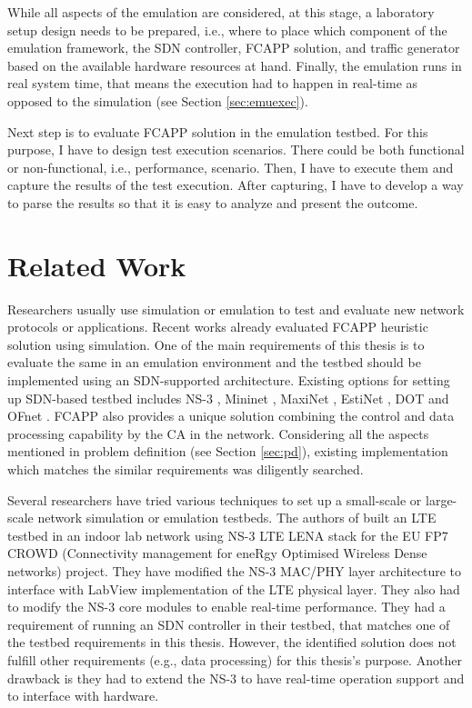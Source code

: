 While all aspects of the emulation are considered, at this stage, a laboratory setup design needs to be prepared, i.e., where to place which component of the emulation framework, the SDN controller, FCAPP solution, and traffic generator based on the available hardware resources at hand. Finally, the emulation runs in real system time, that means the execution had to happen in real-time as opposed to the simulation (see Section \ref{sec:emuexec}).

Next step is to evaluate FCAPP solution in the emulation testbed. For this purpose, I have to design test execution scenarios. There could be both functional or non-functional, i.e., performance, scenario. Then, I have to execute them and capture the results of the test execution. After capturing, I have to develop a way to parse the results so that it is easy to analyze and present the outcome.

\section{Related Work}
Researchers usually use simulation or emulation to test and evaluate new network protocols or applications. Recent works \cite{7343600} already evaluated FCAPP heuristic solution using simulation. One of the main requirements of this thesis is to evaluate the same in an emulation environment and the testbed should be implemented using an SDN-supported architecture. Existing options for setting up SDN-based testbed includes NS-3 \cite{ns-3}, Mininet \cite{Lantz:2010:NLR:1868447.1868466}, MaxiNet \cite{6857078}, EstiNet \cite{6588659}, DOT \cite{6838241} and OFnet \cite{ofnet}. FCAPP also provides a unique solution combining the control and data processing capability by the CA in the network. Considering all the aspects mentioned in problem definition (see Section \ref{sec:pd}), existing implementation which matches the similar requirements was diligently searched.

Several researchers have tried various techniques to set up a small-scale or large-scale network simulation or emulation testbeds. The authors of \cite{Gupta:2015:NRE:2756509.2756516} built an LTE testbed in an indoor lab network using NS-3 LTE LENA stack for the EU FP7 CROWD (Connectivity management for eneRgy Optimised Wireless Dense networks) project. They have modified the NS-3 MAC/PHY layer architecture to interface with LabView implementation of the LTE physical layer. They also had to modify the NS-3 core modules to enable real-time performance. They had a requirement of running an SDN controller in their testbed, that matches one of the testbed requirements in this thesis. However, the identified solution does not fulfill other requirements (e.g., data processing) for this thesis's purpose. Another drawback is they had to extend the NS-3 to have real-time operation support and to interface with hardware. 

